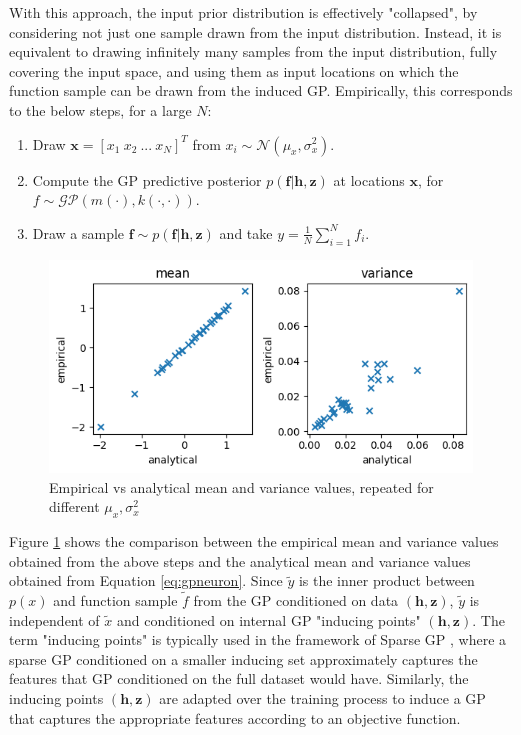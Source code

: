 \documentclass{article}
\begin{document}
With this approach, the input prior distribution is effectively "collapsed", by considering not just one sample drawn from the input distribution. Instead, it is equivalent to drawing infinitely many samples from the input distribution, fully covering the input space, and using them as input locations on which the function sample can be drawn from the induced GP. Empirically, this corresponds to the below steps, for a large $N$:
\begin{enumerate}
    \item Draw $\boldsymbol{x}=[x_1\: x_2\: ... \: x_N]^T$ from $x_i\sim \mathcal{N}(\mu_x,\sigma_x^2)$.
    \item Compute the GP predictive posterior $p(\boldsymbol{f}|\boldsymbol{h},\boldsymbol{z})$ at locations $\boldsymbol{x}$, for $f\sim\mathcal{GP}(m(\cdot),k(\cdot,\cdot))$.
    \item Draw a sample $\boldsymbol{f}\sim p(\boldsymbol{f}|\boldsymbol{h},\boldsymbol{z})$ and take $y=\frac{1}{N}\sum_{i=1}^{N}f_i$.
\end{enumerate}

\begin{figure}[t]
    \centering
    \includegraphics[width=0.6\columnwidth]{GP_neuron_sim.png}
    \caption{Empirical vs analytical mean and variance values, repeated for different $\mu_x,\sigma_x^2$}
    \label{fig:GP_sim}
\end{figure}

Figure \ref{fig:GP_sim} shows the comparison between the empirical mean and variance values obtained from the above steps and the analytical mean and variance values obtained from Equation \ref{eq:gpneuron}. Since $\tilde{y}$ is the inner product between $p(x)$ and function sample $\tilde{f}$ from the GP conditioned on data $(\boldsymbol{h},\boldsymbol{z})$, $\tilde{y}$ is independent of $\tilde{x}$ and conditioned on internal GP "inducing points" $(\boldsymbol{h},\boldsymbol{z})$. The term "inducing points" is typically used in the framework of Sparse GP \cite{inducingGP,variationalInducingGP}, where a sparse GP conditioned on a smaller inducing set approximately captures the features that GP conditioned on the full dataset would have. Similarly, the inducing points $(\boldsymbol{h},\boldsymbol{z})$ are adapted over the training process to induce a GP that captures the appropriate features according to an objective function.
\end{document}
